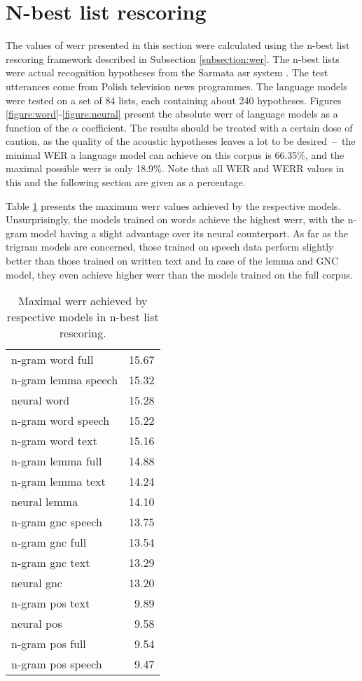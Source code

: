 \section{N-best list rescoring}
\label{section:nbest}
The values of \gls{werr} presented in this section were calculated using the n-best list rescoring framework described in Subsection \ref{subsection:wer}. The n-best lists were actual recognition hypotheses from the Sarmata \gls{asr} system \cite{ziolko2011automatic}. The test utterances come from Polish television news programmes. The language models were tested on a set of 84 lists, each containing about 240 hypotheses. Figures \ref{figure:word}-\ref{figure:neural} present the absolute \gls{werr} of language models as a function of the $\alpha$ coefficient. The results should be treated with a certain dose of caution, as the quality of the acoustic hypotheses leaves a lot to be desired~--~the minimal WER a language model can achieve on this corpus is 66.35\%, and the maximal possible \gls{werr} is only 18.9\%. Note that all WER and WERR values in this and the following section are given as a percentage.

 Table \ref{table:max_werr} presents the maximum \gls{werr} values achieved by the respective models. Unsurprisingly, the models trained on words achieve the highest \gls{werr}, with the n-gram model having a slight advantage over its neural counterpart. As far as the trigram models are concerned, those trained on speech data perform slightly better than those trained on written text and In case of the lemma and GNC model, they even achieve higher \gls{werr} than the models trained on the full corpus.

\begin{table}[!htbp]
	\centering
	\caption[Maximal WERR achieved by respective models in \mbox{n-best} list rescoring]{Maximal \gls{werr} achieved by respective models in n-best list rescoring.}
	\label{table:max_werr}
	\begin{tabular*}{.4\linewidth}{@{\extracolsep{\fill}}lr}
		n-gram word full    & 15.67\\
		n-gram lemma speech  & 15.32\\
		neural word   & 15.28\\
		n-gram word speech  & 15.22\\
		n-gram word text    & 15.16\\
		n-gram lemma full    & 14.88\\
		n-gram lemma text    & 14.24\\
		neural lemma  & 14.10\\
		n-gram gnc speech & 13.75\\
		n-gram gnc full   & 13.54\\
		n-gram gnc text   & 13.29\\
		neural gnc    & 13.20\\
		n-gram pos text   & 9.89\\
		neural pos    & 9.58\\
		n-gram pos full   & 9.54\\
		n-gram pos speech & 9.47\\
	\end{tabular*}
\end{table}

